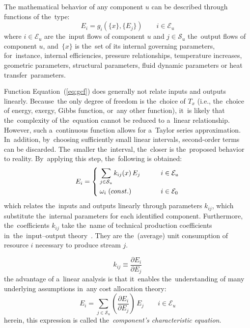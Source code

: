 \documentclass[energies,article,accept,moreauthors,pdftex]{Definitions/mdpi}
\newcommand{\dpartial}[2]{\left(\dfrac{\partial E_{#1}}{\partial E_{#2}}\right)}
\begin{document}
The mathematical behavior of any component $u$ can be described through functions of the~type:
\begin{equation}
    \label{eq:gcf}
    E_i=g_i\left(\{x\},\{E_j\}\right) \qquad i\in\mathcal{E}_u
\end{equation}
where $i\in\mathcal{E}_u$ are the~input flows of component $u$ and $j\in\mathcal{S}_u$ the~output flows of component $u$, and~$\{x\}$ is the~set of its internal governing parameters, for~instance, internal efficiencies, pressure relationships, temperature increases, geometric parameters, structural parameters, fluid dynamic parameters or heat transfer~parameters.

Function Equation~(\ref{eq:gcf}) does generally not relate inputs and outputs linearly. Because~the only degree of freedom is the~choice of $T_x$ (i.e., the~choice of energy, exergy, Gibbs function, or~any other function), it~is likely that the~complexity of the~equation cannot be reduced to a~linear relationship.
However, such a~continuous function allows for a~Taylor series approximation. In~addition, by~choosing sufficiently small linear intervals, second-order terms can be discarded. The~smaller the~interval, the~closer is the~proposed behavior to reality. By~applying this step, the~following is obtained:
\begin{equation}
    E_i=\begin{dcases}
    \;\sum\limits_{j\in\mathcal{S}_u}{k_{ij}(x)\,E_j} \qquad &i\in\mathcal{E}_u \\
    \;\omega_i\;\text(const.) \qquad &i\in\mathcal{E}_0
    \end{dcases}
    \label{eq:echar}
\end{equation}
which relates the~inputs and outputs linearly through parameters $k_{ij}$, which substitute the~internal parameters for each identified component. Furthermore, the~coefficients $k_{ij}$ take the~name of technical production coefficients in~the~input–output theory~\cite{Leontief1970}. They are the~(average) unit consumption of resource $i$ necessary to produce stream $j$.

\begin{equation}
    k_{ij}\equiv\dfrac{\partial E_{i}}{\partial E_{j}}
\end{equation}
the advantage of a~linear analysis is that it~enables the~understanding of many underlying assumptions in~any cost allocation theory:
\begin{equation}
    E_i=\sum_{j\in\mathcal{S}_u}{\dpartial{i}{j}\,E_j} \qquad i\in\mathcal{E}_u
    \label{eq:deqchar}
\end{equation}
herein, this expression is called the~\emph{component's characteristic equation}.
\end{document}
